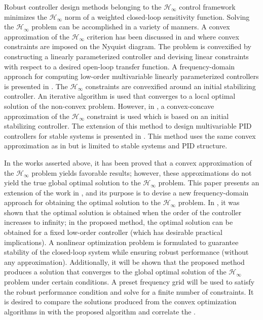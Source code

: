 \documentclass[letterpaper, 10 pt, conference]{ieeeconf}  %
\begin{document}
Robust controller design methods belonging to the $\mathcal{H}_{\infty}$ control framework minimizes the $\mathcal{H}_{\infty}$ norm of a weighted closed-loop sensitivity function. Solving the $\mathcal{H}_{\infty}$ problem can be accomplished in a variety of manners. A convex approximation of the $\mathcal{H}_\infty$ criterion has been discussed in \cite{KG10} and \cite{KGL08} where convex constraints are imposed on the Nyquist diagram. The problem is convexified by constructing a linearly parameterized controller and devising linear constraints with respect to a desired open-loop transfer function.  A frequency-domain approach for computing low-order multivariable linearly parameterized controllers is presented in \cite{SOW10}. The $\mathcal{H}_{\infty}$ constraints are convexified around an initial stabilizing controller. An iterative algorithm is used that converges to a local optimal solution of the non-convex problem. However, in \cite{HAB13},  a convex-concave approximation of the $\mathcal{H}_{\infty}$ constraint is used which is based on an initial stabilizing controller. The extension of this method to design multivariable PID controllers for stable systems is presented in \cite{BHA16}. This method uses the same convex approximation as in  \cite{SOW10} but is limited to stable systems and PID structure. 

In the works asserted above, it has been proved that a convex approximation of the $\mathcal{H}_{\infty}$ problem yields favorable results; however, these approximations do not yield the true global optimal solution to the $\mathcal{H}_{\infty}$ problem. This paper presents an extension of the work in \cite{KNZ16}, and its purpose is to devise a new frequency-domain approach for obtaining the optimal solution to the $\mathcal{H}_{\infty}$ problem. In \cite{KNZ16}, it was shown that the optimal solution is obtained when the order of the controller increases to infinity; in the proposed method, the optimal solution can be obtained for a fixed low-order controller (which has desirable practical implications). A nonlinear optimization problem is formulated to guarantee stability of the closed-loop system while ensuring robust performance (without any approximation). Additionally, it will be shown that the proposed method produces a solution that converges to the global optimal solution of the $\mathcal{H}_{\infty}$ problem under certain conditions. A preset frequency grid will be used to satisfy the robust performance condition and solve for a finite number of constraints. It is desired to compare the solutions produced from the convex optimization algorithms in \cite{KNZ16} with the proposed algorithm and correlate the . 
 
\end{document}
